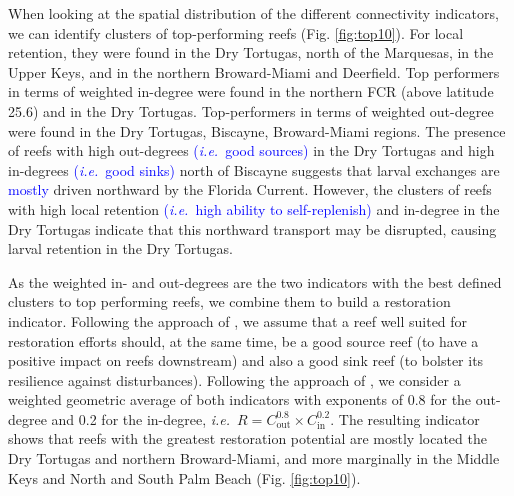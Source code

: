 \documentclass[preprint,12pt,authoryear]{elsarticle}
\newcommand{\modif}[1]{\textcolor{blue}{#1}}
\newcommand{\ie}{{\it i.e.}\ }
\begin{document}
	When looking at the spatial distribution of the different connectivity indicators, we can identify clusters of top-performing reefs (Fig. \ref{fig:top10}). For local retention, they were found in the Dry Tortugas, north of the Marquesas, in the Upper Keys, and in the northern Broward-Miami and Deerfield. Top performers in terms of weighted in-degree were found in the northern FCR (above latitude 25.6) and in the Dry Tortugas. Top-performers in terms of weighted out-degree were found in the Dry Tortugas, Biscayne, Broward-Miami regions. The presence of reefs with high out-degrees \modif{(\ie good sources)} in the Dry Tortugas and high in-degrees \modif{(\ie good sinks)} north of Biscayne suggests that larval exchanges are \modif{mostly} driven northward by the Florida Current. However, the clusters of reefs with high local retention \modif{(\ie high ability to self-replenish)} and in-degree in the Dry Tortugas indicate that this northward transport may be disrupted, causing larval retention in the Dry Tortugas.
	
	As the weighted in- and out-degrees are the two indicators with the best defined clusters to top performing reefs, we combine them to build a restoration indicator. Following the approach of \cite{frys2020fine}, we assume that a reef well suited for restoration efforts should, at the same time, be a good source reef (to have a positive impact on reefs downstream) and also a good sink reef (to bolster its resilience against disturbances). Following the approach of \cite{tnc2024}, we consider a weighted geometric average of both indicators with exponents of 0.8 for the out-degree and 0.2 for the in-degree, \ie $R = C_\text{out}^{0.8} \times C_\text{in}^{0.2}$. The resulting indicator shows that reefs with the greatest restoration potential are mostly located the Dry Tortugas and northern Broward-Miami, and more marginally in the Middle Keys and North and South Palm Beach (Fig. \ref{fig:top10}).
	
\end{document}
